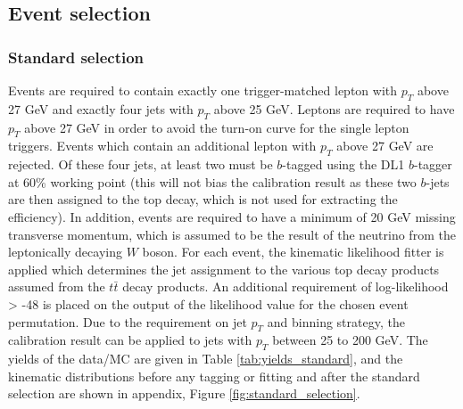 \documentclass[letterpaper,12pt]{article}
\begin{document}
\subsection{Event selection}
\label{Event selection}


\subsubsection{Standard selection}
\label{standard selection}
Events are required to contain exactly one trigger-matched lepton with $p_{T}$ above 27 GeV and exactly four jets with $p_{T}$ above 25 GeV. Leptons are required to have $p_{T}$ above 27 GeV in order to avoid the turn-on curve for the single lepton triggers. Events which contain an additional lepton with $p_T$ above 27 GeV are rejected. Of these four jets, at least two must be $b$-tagged using the DL1 $b$-tagger at 60\% working point (this will not bias the calibration result as these two $b$-jets are then assigned to the top decay, which is not used for extracting the efficiency). In addition, events are required to have a minimum of 20 GeV missing transverse momentum, which is assumed to be the result of the neutrino from the leptonically decaying $W$ boson. For each event, the kinematic likelihood fitter is applied which determines the jet assignment to the various top decay products assumed from the $t\bar{t}$ decay products. An additional requirement of log-likelihood > -48  is placed on the output of the likelihood value for the chosen event permutation. Due to the requirement on jet $p_T$ and binning strategy, the calibration result can be applied to jets with $p_{T}$ between 25 to 200 GeV. The yields of the data/MC are given in Table \ref{tab:yields_standard}, and the kinematic distributions before any tagging or fitting and after the standard selection are shown in appendix, Figure \ref{fig:standard_selection}.
\end{document}
